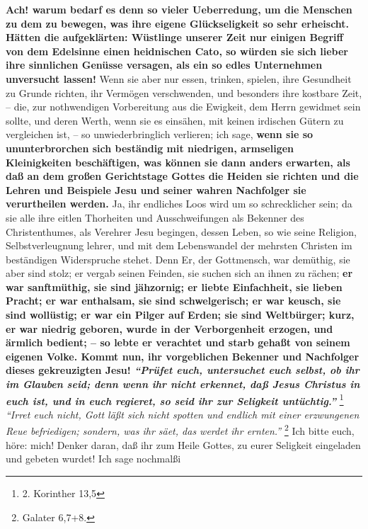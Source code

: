 \medskip

\textbf{Ach! warum bedarf es denn so vieler Ueberredung, um die Menschen zu dem
zu
bewegen, was ihre eigene Glückseligkeit so sehr erheischt. Hätten die
aufgeklärten: Wüstlinge unserer Zeit nur einigen Begriff von dem Edelsinne einen
heidnischen Cato, so würden sie sich lieber ihre
sinnlichen Genüsse
versagen, als ein so edles Unternehmen unversucht lassen!} Wenn sie aber nur
essen, trinken, spielen, ihre Gesundheit zu Grunde richten, ihr Vermögen
verschwenden, und besonders ihre kostbare Zeit, -- die, zur nothwendigen
Vorbereitung aus die Ewigkeit, dem Herrn gewidmet sein sollte, und deren Werth,
wenn sie es einsähen, mit keinen irdischen Gütern zu vergleichen ist, -- so
unwiederbringlich verlieren; ich sage, \textbf{wenn sie so ununterbrorchen sich
beständig mit niedrigen, armseligen Kleinigkeiten beschäftigen, was können sie
dann anders erwarten, als daß an dem großen Gerichtstage Gottes die
Heiden sie
richten und die Lehren und Beispiele Jesu und seiner wahren Nachfolger sie
verurtheilen werden.} Ja, ihr endliches Loos wird um so schrecklicher sein; da
sie alle ihre eitlen Thorheiten und Ausschweifungen als Bekenner des
Christenthumes, als Verehrer Jesu begingen, dessen Leben, so wie seine
Religion, Selbstverleugnung lehrer, und mit dem Lebenswandel der mehrsten
Christen im beständigen Widerspruche stehet. Denn Er, der
Gottmensch, war
demüthig, sie aber sind stolz; er vergab seinen Feinden, sie suchen sich an
ihnen zu rächen; \textbf{er war sanftmüthig, sie sind jähzornig; er liebte
Einfachheit,
sie lieben Pracht; er war enthalsam, sie sind schwelgerisch; er war keusch, sie
sind wollüstig; er war ein Pilger auf Erden; sie sind Weltbürger; kurz, er war
niedrig geboren, wurde in der Verborgenheit erzogen, und ärmlich  bedient; -- so
lebte er verachtet und starb gehaßt von seinem eigenen Volke. Kommt nun, ihr
vorgeblichen Bekenner und Nachfolger dieses gekreuzigten Jesu!
\textit{"`Prüfet euch,
untersuchet euch selbst, ob ihr im Glauben seid; denn wenn ihr nicht erkennet,
daß Jesus Christus in euch ist, und in euch regieret, so seid ihr zur
Seligkeit untüchtig."'}}
\footnote{2. Korinther 13,5}
\textit{"`Irret euch
nicht, Gott läßt sich nicht spotten und endlich mit einer erzwungenen Reue
befriedigen; sondern, was ihr säet, das werdet ihr ernten."'}
\footnote{Galater 6,7+8.}
Ich bitte euch, höre: mich! Denker daran, daß ihr zum Heile Gottes, zu
eurer Seligkeit eingeladen und gebeten wurdet! Ich sage nochmalßi
